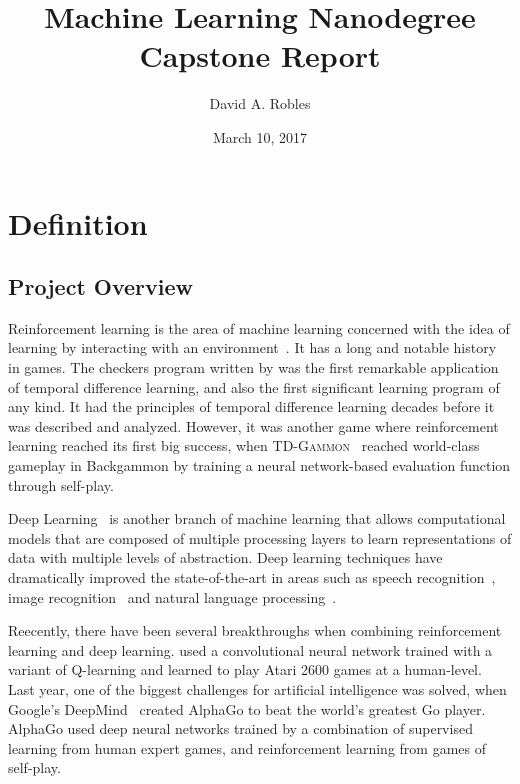 \documentclass{article}
\title{Machine Learning Nanodegree \\ Capstone Report}
\author{David A. Robles}
\date{March 10, 2017}
\begin{document}
\maketitle

\section{Definition}

\subsection{Project Overview}

Reinforcement learning is the area of machine learning concerned with the idea of learning by
interacting with an environment~\citep{Sutton1998RL}. It has a long and notable history in games.
The checkers program written by \citet{Samuel1959Checkers} was the first remarkable application of
temporal difference learning, and also the first significant learning program of any kind. It had
the principles of temporal difference learning decades before it was described and analyzed.
However, it was another game where reinforcement learning reached its first big success, when
\textsc{TD-Gammon}~\citep{Tesauro1995TD} reached world-class gameplay in Backgammon by training a
neural network-based evaluation function through self-play.

Deep Learning~\citep{LeCun2015Nature} is another branch of machine learning that allows
computational models that are composed of multiple processing layers to learn representations of
data with multiple levels of abstraction. Deep learning techniques have dramatically improved the
state-of-the-art in areas such as speech recognition~\citep{Hinton2012Speech}, image
recognition~\citep{Krizhevsky2012ImageNet} and natural language processing~\citep{Colbert2012}.

Reecently, there have been several breakthroughs when combining reinforcement learning and deep
learning. \cite{Mnih2015AtariNature} used a convolutional neural network trained with a variant of
Q-learning and learned to play Atari 2600 games at a human-level. Last year, one of the biggest
challenges for artificial intelligence was solved, when Google's DeepMind~\citep{Silver2016GoNature}
created AlphaGo to beat the world's greatest Go player. AlphaGo used deep neural networks trained by
a combination of supervised learning from human expert games, and reinforcement learning from games
of self-play.
\end{document}
